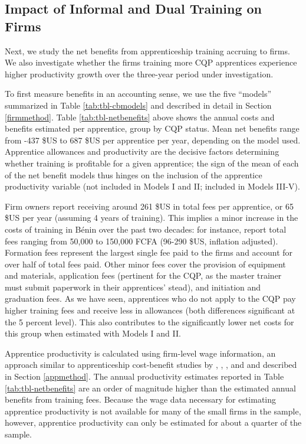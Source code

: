 \documentclass[
  a4paper, twoside, 12pt]{book}
\begin{document}
\hypertarget{firmimpact}{%
\subsection{Impact of Informal and Dual Training on Firms}\label{firmimpact}}

Next, we study the net benefits from apprenticeship training accruing to firms. We also investigate whether the firms training more CQP apprentices experience higher productivity growth over the three-year period under investigation.

To first measure benefits in an accounting sense, we use the five ``models'' summarized in Table \ref{tab:tbl-cbmodels} and described in detail in Section \ref{firmmethod}. Table \ref{tab:tbl-netbenefits} above shows the annual costs and benefits estimated per apprentice, group by CQP status. Mean net benefits range from -437 \$US to 687 \$US per apprentice per year, depending on the model used. Apprentice allowances and productivity are the decisive factors determining whether training is profitable for a given apprentice; the sign of the mean of each of the net benefit models thus hinges on the inclusion of the apprentice productivity variable (not included in Models I and II; included in Models III-V).

Firm owners report receiving around 261 \$US in total fees per apprentice, or 65 \$US per year (assuming 4 years of training). This implies a minor increase in the costs of training in Bénin over the past two decades: for instance, \textcite{walther2007} report total fees ranging from 50,000 to 150,000 FCFA (96-290 \$US, inflation adjusted). Formation fees represent the largest single fee paid to the firms and account for over half of total fees paid. Other minor fees cover the provision of equipment and materials, application fees (pertinent for the CQP, as the master trainer must submit paperwork in their apprentices' stead), and initiation and graduation fees. As we have seen, apprentices who do not apply to the CQP pay higher training fees and receive less in allowances (both differences significant at the 5 percent level). This also contributes to the significantly lower net costs for this group when estimated with Models I and II.

Apprentice productivity is calculated using firm-level wage information, an approach similar to apprenticeship cost-benefit studies by \textcite{wolter2015}, \textcite{muhlemann2018}, \textcite{bolli2020}, and \textcite{bolli2021} and described in Section \ref{appmethod}. The annual productivity estimates reported in Table \ref{tab:tbl-netbenefits} are an order of magnitude higher than the estimated annual benefits from training fees. Because the wage data necessary for estimating apprentice productivity is not available for many of the small firms in the sample, however, apprentice productivity can only be estimated for about a quarter of the sample.
\end{document}
